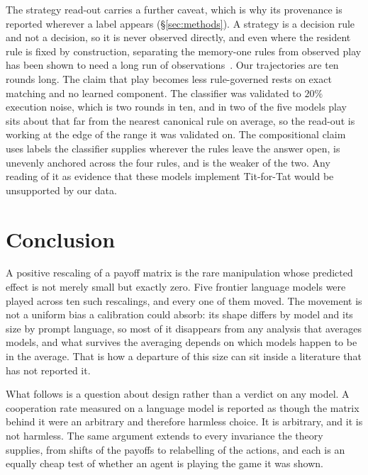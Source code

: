 \documentclass[11pt,a4paper]{article}
\begin{document}
The strategy read-out carries a further caveat, which is why its provenance is
reported wherever a label appears (\S\ref{sec:methods}). A strategy is a decision
rule and not a decision, so it is never observed directly, and even where the
resident rule is fixed by construction, separating the memory-one rules from
observed play has been shown to need a long run of
observations~\citep{kim2021win}. Our trajectories are ten rounds long. The claim that play
becomes less rule-governed rests on exact matching and no learned component.
The classifier was validated to $20\%$ execution noise, which is two rounds in
ten, and in two of the five models play sits about that far from the nearest
canonical rule on average, so the read-out is working at the edge of the range
it was validated on.
The compositional claim uses labels the classifier supplies wherever the rules
leave the answer open, is unevenly anchored across the four rules, and is the
weaker of the two. Any reading of it as evidence that these models implement
Tit-for-Tat would be unsupported by our data.

\section{Conclusion}
\label{sec:conclusion}

A positive rescaling of a payoff matrix is the rare manipulation whose
predicted effect is not merely small but exactly zero. Five frontier language
models were played across ten such rescalings, and every one of them moved. The
movement is not a uniform bias a calibration could absorb: its shape differs by
model and its size by prompt language, so most of it disappears from any
analysis that averages models, and what survives the averaging depends on which
models happen to be in the average. That is how a departure of this size can
sit inside a literature that has not reported it.

What follows is a question about design rather than a verdict on any model. A
cooperation rate measured on a language model is reported as though the matrix
behind it were an arbitrary and therefore harmless choice. It is arbitrary, and
it is not harmless. The same argument extends to every invariance the theory
supplies, from shifts of the payoffs to relabelling of the actions, and each is
an equally cheap test of whether an agent is playing the game it was shown.
\end{document}
